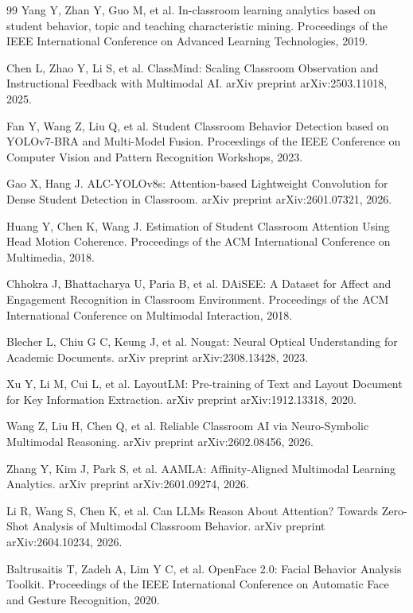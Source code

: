 \documentclass[12pt,hyperref,a4paper,UTF8]{ctexart}
\begin{document}
\begin{thebibliography}{99}
 Yang Y, Zhan Y, Guo M, et al. In-classroom learning analytics based on student behavior, topic and teaching characteristic mining. Proceedings of the IEEE International Conference on Advanced Learning Technologies, 2019.

 Chen L, Zhao Y, Li S, et al. ClassMind: Scaling Classroom Observation and Instructional Feedback with Multimodal AI. arXiv preprint arXiv:2503.11018, 2025.

 Fan Y, Wang Z, Liu Q, et al. Student Classroom Behavior Detection based on YOLOv7-BRA and Multi-Model Fusion. Proceedings of the IEEE Conference on Computer Vision and Pattern Recognition Workshops, 2023.

 Gao X, Hang J. ALC-YOLOv8s: Attention-based Lightweight Convolution for Dense Student Detection in Classroom. arXiv preprint arXiv:2601.07321, 2026.

 Huang Y, Chen K, Wang J. Estimation of Student Classroom Attention Using Head Motion Coherence. Proceedings of the ACM International Conference on Multimedia, 2018.

 Chhokra J, Bhattacharya U, Paria B, et al. DAiSEE: A Dataset for Affect and Engagement Recognition in Classroom Environment. Proceedings of the ACM International Conference on Multimodal Interaction, 2018.

 Blecher L, Chiu G C, Keung J, et al. Nougat: Neural Optical Understanding for Academic Documents. arXiv preprint arXiv:2308.13428, 2023.

 Xu Y, Li M, Cui L, et al. LayoutLM: Pre-training of Text and Layout Document for Key Information Extraction. arXiv preprint arXiv:1912.13318, 2020.

 Wang Z, Liu H, Chen Q, et al. Reliable Classroom AI via Neuro-Symbolic Multimodal Reasoning. arXiv preprint arXiv:2602.08456, 2026.

 Zhang Y, Kim J, Park S, et al. AAMLA: Affinity-Aligned Multimodal Learning Analytics. arXiv preprint arXiv:2601.09274, 2026.

 Li R, Wang S, Chen K, et al. Can LLMs Reason About Attention? Towards Zero-Shot Analysis of Multimodal Classroom Behavior. arXiv preprint arXiv:2604.10234, 2026.

 Baltrusaitis T, Zadeh A, Lim Y C, et al. OpenFace 2.0: Facial Behavior Analysis Toolkit. Proceedings of the IEEE International Conference on Automatic Face and Gesture Recognition, 2020.


\end{thebibliography}
\end{document}

